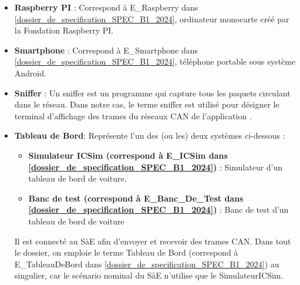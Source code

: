 \begin{itemize}
    \item \textbf{Raspberry PI} : Correspond à E\_Raspberry dans \hyperref[SPEC]{[dossier\_de\_specification\_SPEC\_B1\_2024]}, ordinateur monocarte créé par la Fondation Raspberry PI. \newline
    \item \textbf{Smartphone} : Correspond à E\_Smartphone dans \hyperref[SPEC]{[dossier\_de\_specification\_SPEC\_B1\_2024]}, téléphone portable sous système Android. \newline
    \item \textbf{Sniffer} : Un sniffer est un programme qui capture tous les paquets circulant dans le réseau. Dans notre cas, le terme sniffer est utilisé pour désigner le terminal d'affichage des trames du réseaux CAN de l'application {\nomApplication}. \newline
    \item \textbf{Tableau de Bord}: Représente l'un des (ou les) deux systèmes ci-dessous :
        \begin{itemize}
            \item \textbf{Simulateur ICSim (correspond à E\_ICSim dans \hyperref[SPEC]{[dossier\_de\_specification\_SPEC\_B1\_2024]})} : Simulateur d'un tableau de bord de voiture. 
            \item \textbf{Banc de test (correspond à E\_Banc\_De\_Test dans \hyperref[SPEC]{[dossier\_de\_specification\_SPEC\_B1\_2024]})} : Banc de test d'un tableau de bord de voiture
        \end{itemize}
        Il est connecté au SàE afin d'envoyer et recevoir des trames CAN. 
        Dans tout le dossier, on emploie le terme Tableau de Bord (correspond à E\_TableauDeBord dans \hyperref[SPEC]{[dossier\_de\_specification\_SPEC\_B1\_2024]}) au singulier, car le scénario nominal du SàE n'utilise que le SimulateurICSim.\newline

\end{itemize}










